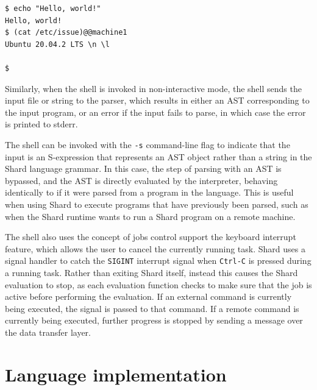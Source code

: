 \documentclass[twoside]{report}
\begin{document}
\begin{minipage}[c]{\textwidth-15pt}
  \begin{lstlisting}[language=Shard]
$ echo "Hello, world!"
Hello, world!
$ (cat /etc/issue)@@machine1
Ubuntu 20.04.2 LTS \n \l

$
\end{lstlisting}
  \smallskip
\end{minipage}

Similarly, when the shell is invoked in non-interactive mode, the shell sends the input file or string to the parser, which results in either an AST corresponding to the input program, or an error if the input fails to parse, in which case the error is printed to stderr.

The shell can be invoked with the \texttt{-s} command-line flag to indicate that the input is an S-expression that represents an AST object rather than a string in the Shard language grammar. In this case, the step of parsing with an AST is bypassed, and the AST is directly evaluated by the interpreter, behaving identically to if it were parsed from a program in the language.
This is useful when using Shard to execute programs that have previously been parsed, such as when the Shard runtime wants to run a Shard program on a remote machine.

The shell also uses the concept of jobs control support the keyboard interrupt feature, which allows the user to cancel the currently running task.
Shard uses a signal handler to catch the \texttt{SIGINT} interrupt signal when \texttt{Ctrl-C} is pressed during a running task.
Rather than exiting Shard itself, instead this causes the Shard evaluation to stop, as each evaluation function checks to make sure that the job is active before performing the evaluation.
If an external command is currently being executed, the signal is passed to that command. If a remote command is currently being executed, further progress is stopped by sending a message over the data transfer layer.

\section{Language implementation}

\end{document}
